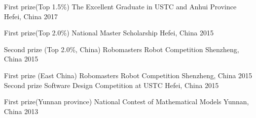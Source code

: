 



\begin{cvhonors}

  \cvhonor
    {First prize(Top 1.5\%)} %
    {The Excellent Graduate in USTC and Anhui Province} %
    {Hefei, China} %
    {2017} %

  \cvhonor
    {First prize(Top 2.0\%)} %
    {National Master Scholarship} %
    {Hefei, China} %
    {2015} %

  \cvhonor
    {Second prize (Top 2.0\%, China) } %
    {Robomasters Robot Competition} %
    {Shenzheng, China} %
    {2015} %
 
  \cvhonor
    {First prize (East China)} %
    {Robomasters Robot Competition} %
    {Shenzheng, China} %
    {2015} %
  \cvhonor
    {Second prize} %
    {Software Design Competition at USTC} %
    {Hefei, China} %
    {2015} %

  \cvhonor
    {First prize(Yunnan province)} %
    {National Contest of Mathematical Models} %
    {Yunnan, China} %
    {2013} %


\end{cvhonors}





